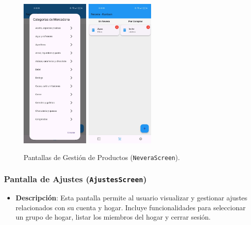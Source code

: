 \documentclass{article}
\begin{document}
\begin{flushleft}
\begin{figure}[H]
\includegraphics[width=0.3\textwidth]{TFG/img/img/api.jpeg}
\includegraphics[width=0.3\textwidth]{TFG/img/img/nevera.jpeg}

 
    \caption{Pantallas de Gesti\'on de Productos (\texttt{NeveraScreen}).}
    \label{fig:nevera_screen}
\end{figure}

\clearpage

\subsubsection{Pantalla de Ajustes (\texttt{AjustesScreen})}
\begin{itemize}
    \item \textbf{Descripci\'on}: 
    Esta pantalla permite al usuario visualizar y gestionar ajustes relacionados con su cuenta y hogar. Incluye funcionalidades para seleccionar un grupo de hogar, listar los miembros del hogar y cerrar sesi\'on.


\end{itemize}
\end{flushleft}
\end{document}
